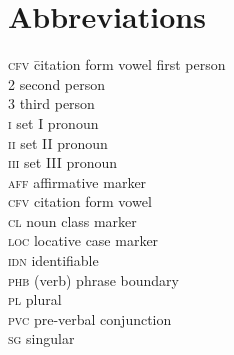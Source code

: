 \documentclass[output=paper]{langsci/langscibook}
\begin{document}
\section*{Abbreviations}
\setlength{\parindent}{0pt}
\begin{tabbing}
\textsc{cfv} \hspace{1em}\= citation form vowel \> first person                          \\
2 \> second person                         \\
3 \> third person                          \\
\textsc{i} \> set I pronoun                \\
\textsc{ii} \> set II pronoun              \\
\textsc{iii} \> set III pronoun            \\
\textsc{aff} \> affirmative marker         \\

\textsc{cfv} \> citation form vowel        \\

\textsc{cl} \> noun class marker           \\

\textsc{loc} \> locative case marker       \\

\textsc{idn} \> identifiable               \\

\textsc{phb} \> (verb) phrase boundary     \\

\textsc{pl} \> plural                      \\

\textsc{pvc} \> pre-verbal conjunction     \\

\textsc{sg} \> singular                    \\
\end{tabbing}
\setlength{\parindent}{10pt}


{\sloppy
\printbibliography[heading=subbibliography,notkeyword=this]
}
\end{document}
